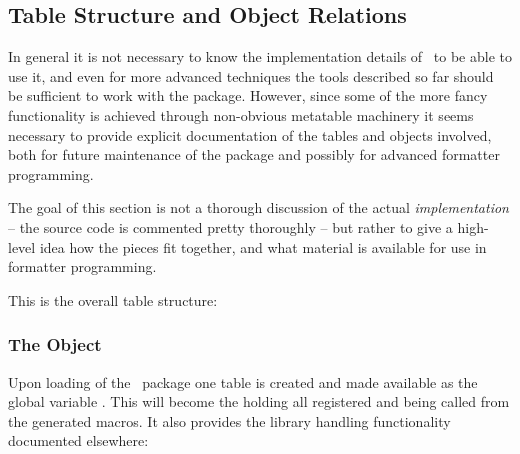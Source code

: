 \documentclass[12pt]{scrartcl}
\begin{document}
\subsection{Table Structure and Object Relations}
\label{sec:advanced:tables-and-objects}

In general it is not necessary to know the implementation details of
\luaformatters\ to be able to use it, and even for more advanced
techniques the tools described so far should be sufficient to work with the
package.  However, since some of the more fancy functionality is achieved
through non-obvious metatable machinery it seems necessary to provide explicit
documentation of the tables and objects involved, both for future maintenance of
the package and possibly for advanced formatter programming.

The goal of this section is not a thorough discussion of the actual
\emph{implementation} -- the source code is commented pretty thoroughly -- but
rather to give a high-level idea how the pieces fit together, and what material
is available for use in formatter programming.

This is the overall table structure:

\medskip


\bigskip


\bigskip



\subsubsection{The  Object}
\label{sec:advanced:the-lua-templates-object}

Upon loading of the \luaformatters\ package one  table
is created and made available as the global variable .
This will become the  holding all registered
 and being called from the generated macros.  It also
provides the library handling functionality documented elsewhere:
\end{document}
